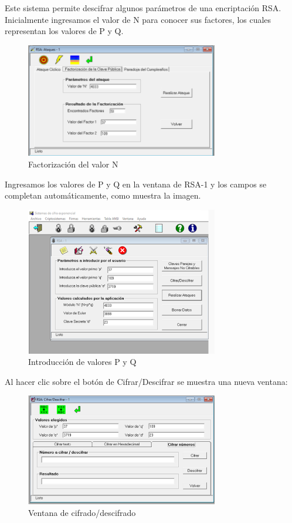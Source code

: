 Este sistema permite descifrar algunos parámetros de una encriptación RSA.
Inicialmente ingresamos el valor de N para conocer sus factores, los cuales representan los valores de P y Q.

\begin{figure}[H]
	\centering
	\includegraphics[width=0.75\textwidth]{./assets/img7.png}
	\caption{Factorización del valor N}
	\label{fig:n-factorization}
\end{figure}

\FloatBarrier

Ingresamos los valores de P y Q en la ventana de RSA-1 y los campos se completan automáticamente, como muestra la imagen.

\begin{figure}[H]
	\centering
	\includegraphics[width=0.75\textwidth]{./assets/img8.png}
	\caption{Introducción de valores P y Q}
	\label{fig:pq-values}
\end{figure}

Al hacer clic sobre el botón de Cifrar/Descifrar se muestra una nueva ventana:

\begin{figure}[H]
	\centering
	\includegraphics[width=0.75\textwidth]{./assets/img9.png}
	\caption{Ventana de cifrado/descifrado}
	\label{fig:cipher-decipher}
\end{figure}

